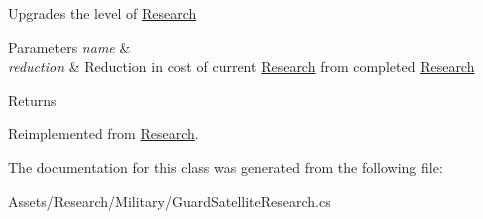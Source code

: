 Upgrades the level of \hyperlink{class_research}{Research} 


\begin{DoxyParams}{Parameters}
{\em name} & \\
\hline
{\em reduction} & Reduction in cost of current \hyperlink{class_research}{Research} from completed \hyperlink{class_research}{Research}\\
\hline
\end{DoxyParams}
\begin{DoxyReturn}{Returns}

\end{DoxyReturn}


Reimplemented from \hyperlink{class_research_a963cb6ac5e27b234a3da2b1be640bc6a}{Research}.



The documentation for this class was generated from the following file\+:\begin{DoxyCompactItemize}
\item 
Assets/\+Research/\+Military/Guard\+Satellite\+Research.\+cs\end{DoxyCompactItemize}
